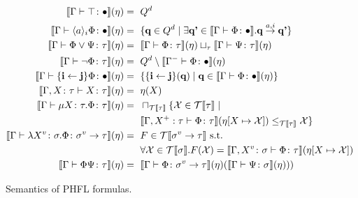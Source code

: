 \begin{figure}
    \caption{Semantics of PHFL formulas.}
    \label{figure:phfl-semantics}
    \begin{align*}
        \llbracket \Gamma \vdash \top \colon \bullet \rrbracket(\eta) =\text{ }& Q^d\\
        \llbracket \Gamma \vdash \langle a \rangle_i \Phi \colon \bullet \rrbracket(\eta) =\text{ }& \{\emph{q} \in Q^d \mid
        \exists \emph{q'} \in \llbracket \Gamma \vdash \Phi \colon \bullet \rrbracket . \emph{q}
        \overset{a, i}{\rightarrow} \emph{q'}\}\\
        \llbracket \Gamma \vdash \Phi \vee \Psi \colon \tau \rrbracket(\eta) =\text{ }& \llbracket \Gamma \vdash \Phi
        \colon \tau \rrbracket (\eta) \sqcup_\tau \llbracket \Gamma \vdash \Psi \colon \tau \rrbracket (\eta)\\
        \llbracket \Gamma \vdash \neg \Phi \colon \tau \rrbracket(\eta) =\text{ }& Q^d \setminus \llbracket \Gamma^- \vdash \Phi
        \colon \bullet \rrbracket (\eta)\\
        \llbracket \Gamma \vdash \{\emph{i} \leftarrow \emph{j}\} \Phi \colon \bullet \rrbracket(\eta) =\text{ }&
        \{\{\emph{i} \leftarrow \emph{j}\}(\emph{q}) \mid \emph{q} \in \llbracket \Gamma \vdash \Phi \colon \bullet
        \rrbracket (\eta)\}\\
        \llbracket \Gamma, X \colon \tau \vdash X \colon \tau \rrbracket(\eta) =\text{ }& \eta(X)\\
        \llbracket \Gamma \vdash \mu X \colon \tau .\Phi \colon \tau \rrbracket(\eta) =\text{ }&
        \sqcap_{\mathcal{T}\llbracket\tau\rrbracket} \{\mathcal{X} \in \mathcal{T}\llbracket \tau \rrbracket \mid \\
        &\llbracket \Gamma, X^+ : \tau \vdash \Phi \colon \tau \rrbracket(\eta[X \mapsto \mathcal{X}])
        \leq_{\mathcal{T}\llbracket \tau \rrbracket} \mathcal{X}\}\\
        \llbracket \Gamma \vdash \lambda X^v \colon \sigma. \Phi \colon \sigma^v \rightarrow \tau \rrbracket
        (\eta) =\text{ }& F \in \mathcal{T}\llbracket \sigma^v \rightarrow \tau \rrbracket \text{ s.t. }\\
        &\forall \mathcal{X} \in
        \mathcal{T}\llbracket \sigma \rrbracket. F(\mathcal{X}) = \llbracket \Gamma, X^v \colon \sigma \vdash \Phi \colon \tau
        \rrbracket (\eta[X \mapsto \mathcal{X}])\\
        \llbracket \Gamma \vdash \Phi \Psi \colon \tau \rrbracket(\eta) =\text{ }& \llbracket \Gamma \vdash \Phi \colon \sigma
        ^v \rightarrow \tau \rrbracket (\eta)(\llbracket \Gamma \vdash \Psi \colon \sigma \rrbracket (\eta)))
    \end{align*}
\end{figure}

